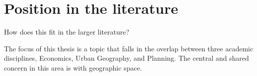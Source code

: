 \section{Position in the literature}
How does this fit in the larger literature?

The focus of this thesis is a topic that falls in the overlap between three academic  disciplines, Economics, Urban Geography, and Planning. %
The central and shared concern in this area is with geographic space. %










